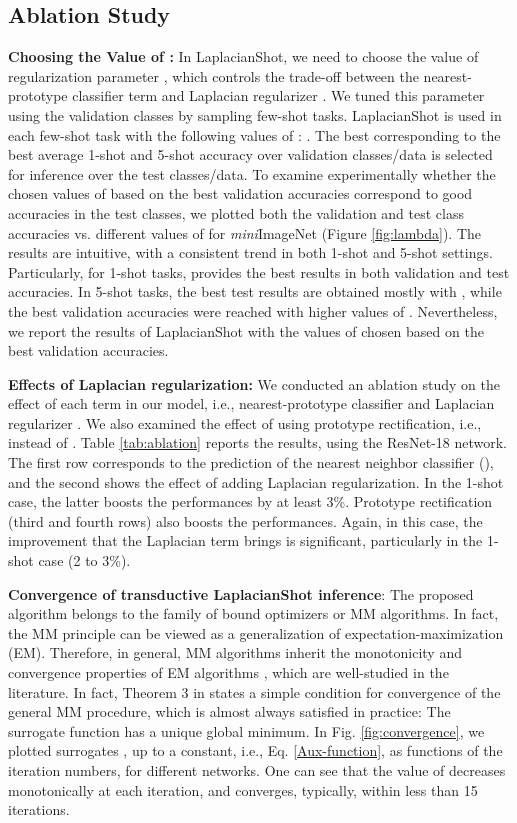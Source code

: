 \documentclass{article}
\begin{document}
\subsection{Ablation Study}
\label{lambda}
\textbf{Choosing the Value of :}
In LaplacianShot, we need to choose the value of regularization parameter , which controls the trade-off between the nearest-prototype classifier term  and Laplacian regularizer . We tuned this parameter using the validation classes by sampling  few-shot tasks. LaplacianShot is used in each few-shot task with the following values of : . The best  corresponding to the best average 1-shot and 5-shot accuracy over validation classes/data is selected for inference over the test classes/data. To examine experimentally whether the chosen values of  based on the best validation accuracies correspond to good accuracies in the test classes, we plotted both the validation and test class accuracies 
vs. different values of  for \textit{mini}ImageNet (Figure \ref{fig:lambda}). The results are intuitive, with a consistent trend in both 1-shot and 5-shot settings. Particularly, for 1-shot tasks,  provides the best results in both  validation and test accuracies. In 5-shot tasks, the best test results are obtained mostly with , while the best validation accuracies were reached with higher values of . Nevertheless, we report the results of LaplacianShot with the values of  chosen based on the best validation accuracies.

\textbf{Effects of Laplacian regularization:}
We conducted an ablation study on the effect of each term in our model, i.e., nearest-prototype classifier  and Laplacian regularizer . We also examined the effect of using prototype rectification, i.e.,  instead of .
Table \ref{tab:ablation} reports the results, using the ResNet-18 network. The first row corresponds to the prediction of the nearest neighbor classifier (), and the second shows the effect of adding Laplacian regularization. In the 1-shot case, the latter boosts the performances by at least 3\%. Prototype rectification (third and fourth rows) also boosts the performances. Again, in this case, the improvement that the Laplacian term brings is significant, particularly in the 1-shot case (2 to 3\%).

\textbf{Convergence of transductive LaplacianShot inference}:
The proposed algorithm belongs to the family of bound optimizers or MM algorithms. 
In fact, the MM principle can be viewed as a generalization of expectation-maximization (EM). Therefore, in general, MM algorithms inherit the monotonicity and convergence properties of EM algorithms \cite{vaida2005parameter}, which are well-studied in the literature. In fact, Theorem 3 in \cite{vaida2005parameter} states a simple condition for convergence of the general MM procedure, which is almost always satisfied in practice: The surrogate function has a unique global minimum. In Fig. \ref{fig:convergence}, we plotted surrogates , up to a constant, i.e., Eq. \eqref{Aux-function}, as functions of the iteration numbers, for different networks. One can see that the value of  decreases monotonically at each iteration, and converges, typically, within less than 15 iterations.
\end{document}
